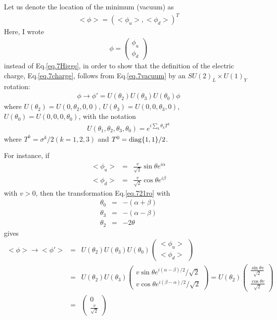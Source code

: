 \documentclass[12pt]{article}
\begin{document}
  Let us denote the location of the minimum (vacuum) as
\begin{eqnarray}
  <\phi> = ( <\phi_u>, <\phi_d> )^T \label{eq.7vacuum}
\end{eqnarray}
 Here, I wrote
\begin{eqnarray}
  \phi = 
  \begin{pmatrix}
    \phi_u \\ \phi_d
  \end{pmatrix}
\end{eqnarray}
  instead of Eq.\ref{eq.7Higgs}, in order to show that the definition
  of the electric charge, Eq.\ref{eq.7charge}, follows from Eq.\ref{eq.7vacuum} by an $SU(2)_L \times U(1)_Y$ rotation:
  \begin{eqnarray}
    \phi \to \phi' = U(\theta_2) U(\theta_3) U(\theta_0) \phi \label{eq.721ro}
  \end{eqnarray}
   where $U(\theta_2) = U(0,\theta_2,0,0)$, $U(\theta_3) = U(0,0,\theta_3,0)$, $U(\theta_0) = U(0,0,0,\theta_0)$, with the notation
\begin{eqnarray}
  U(\theta_1,\theta_2,\theta_3,\theta_0)
  = e^{ i \sum_k \theta_k T^k }
\end{eqnarray}
 where $T^k = \sigma^k/2 (k=1,2,3)$ and $T^0 = {\rm diag}\{1,1\}/2$.

  For instance, if
\begin{eqnarray}
  <\phi_u> &=& \frac{v}{\sqrt 2} \sin\theta e^{i\alpha} \nonumber \\
  <\phi_d> &=& \frac{v}{\sqrt 2} \cos\theta e^{i\beta} \label{eq.7egcon}
\end{eqnarray}
   with $v>0$, then the transformation Eq.\ref{eq.721ro} with
\begin{eqnarray}
  \theta_0 &=& -(\alpha+\beta)\\
  \theta_3 &=& -(\alpha-\beta)\\
  \theta_2 &=& -2\theta
\end{eqnarray}
  gives
\begin{eqnarray}
  <\phi> \to <\phi'>
    &=& U(\theta_2) U(\theta_3) U(\theta_0)
    \begin{pmatrix}
      <\phi_u> \\ <\phi_d>
    \end{pmatrix} \\
    &=& U(\theta_2) U(\theta_3) 
    \begin{pmatrix}
      v \sin\theta e^{i(\alpha-\beta)/2} /\sqrt 2 \\
      v \cos\theta e^{i(\beta-\alpha)/2} /\sqrt 2
    \end{pmatrix}
     = U(\theta_2) 
     \begin{pmatrix}
       \frac{\sin\theta v}{\sqrt 2} \\
       \frac{\cos\theta v}{\sqrt 2}
     \end{pmatrix} \\
    &=&
    \begin{pmatrix}
      0 \\ \frac{v}{\sqrt 2}
    \end{pmatrix} \label{eq.7eg}
\end{eqnarray}
\end{document}
